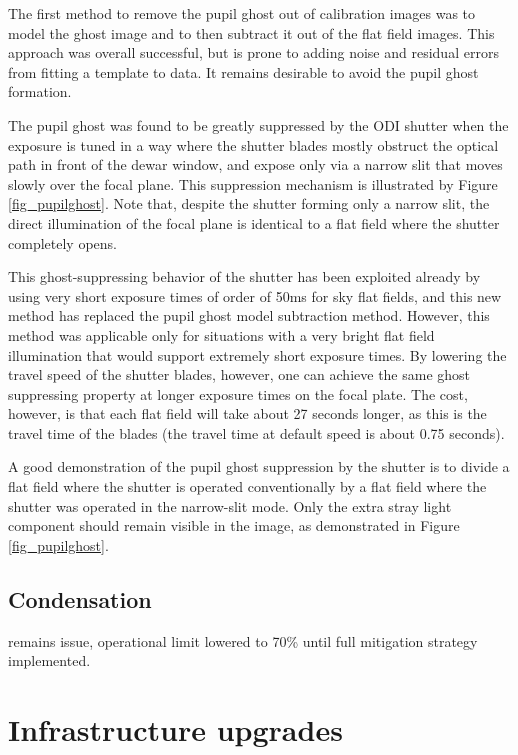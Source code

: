 \documentclass[draft]{spieman}
\begin{document}
The first method to remove the pupil ghost out of calibration images was to
model the ghost image and to then subtract it out of the flat field images. This
approach was overall successful, but is prone to adding noise and residual
errors from fitting a template to data. It remains desirable to avoid the pupil
ghost formation.

The pupil ghost was found to be greatly suppressed by the ODI shutter when the
exposure is tuned in a way where the shutter blades mostly obstruct the optical
path in front of the dewar window, and expose only via a narrow slit that moves
slowly over the focal plane. This suppression mechanism is illustrated by Figure
\ref{fig_pupilghost}. Note that, despite the shutter forming only a narrow slit,
the direct illumination of the focal plane is identical to a flat field where
the shutter completely opens.

This ghost-suppressing behavior of the shutter has been exploited already by
using very short exposure times of order of 50ms for sky flat fields, and this
new method has replaced the pupil ghost model subtraction method. However,
 this method was applicable only for situations with a very
bright flat field illumination that would support extremely short exposure
times. By lowering the travel speed of the shutter blades, however, one can
achieve the same ghost suppressing property at longer exposure times on the
focal plate. The cost, however, is that each flat field will take about 27
seconds longer, as this is the travel time of the blades (the travel time at
default speed is about 0.75 seconds).

A good demonstration of the pupil ghost suppression by the shutter is to divide
a flat field where the shutter is operated conventionally by a flat field where
the shutter was operated in the narrow-slit mode. Only the extra stray light
component should remain visible in the image, as demonstrated in Figure
\ref{fig_pupilghost}.


\subsection{Condensation}

remains issue, operational limit lowered to 70\% until full mitigation
strategy implemented.



\section{Infrastructure upgrades}
\end{document}
